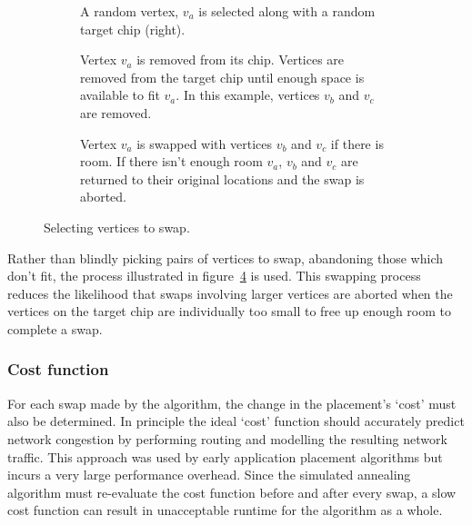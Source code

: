 				\begin{figure}
					\center
					\begin{subfigure}{\linewidth}
						\center
						\caption{A random vertex, $v_a$ is selected along with a random
						target chip (right).}
						\label{fig:sa-swap-select}
					\end{subfigure}
					
					\vspace*{1em}
					
					\begin{subfigure}{\linewidth}
						\center
						\caption{Vertex $v_a$ is removed from its chip. Vertices are removed
						from the target chip until enough space is available to fit $v_a$.
						In this example, vertices $v_b$ and $v_c$ are removed.}
						\label{fig:sa-swap-remove}
					\end{subfigure}
					
					\vspace*{1em}
					
					\begin{subfigure}{\linewidth}
						\center
						\caption{Vertex $v_a$ is swapped with vertices $v_b$ and $v_c$ if
						there is room. If there isn't enough room $v_a$, $v_b$ and $v_c$
						are returned to their original locations and the swap is aborted.}
						\label{fig:sa-swap-commit}
					\end{subfigure}
					
					\caption{Selecting vertices to swap.}
					\label{fig:sa-swap}
				\end{figure}
				
				Rather than blindly picking pairs of vertices to swap, abandoning those
				which don't fit, the process illustrated in figure~\ref{fig:sa-swap} is
				used. This swapping process reduces the likelihood that swaps involving
				larger vertices are aborted when the vertices on the target chip are
				individually too small to free up enough room to complete a swap.
			
			\subsubsection{Cost function}
				
				For each swap made by the algorithm, the change in the placement's
				`cost' must also be determined. In principle the ideal `cost' function
				should accurately predict network congestion by performing routing and
				modelling the resulting network traffic. This approach was used by
				early application placement algorithms \cite{steele85} but incurs a
				very large performance overhead. Since the simulated annealing
				algorithm must re-evaluate the cost function before and after every
				swap, a slow cost function can result in unacceptable runtime for the
				algorithm as a whole.
				
